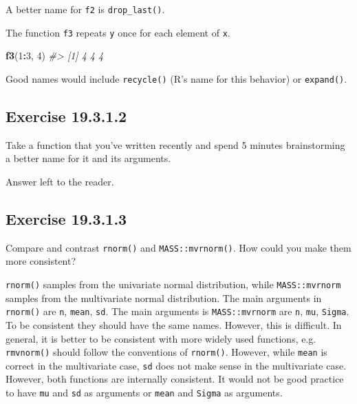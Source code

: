 \documentclass[]{book}
\newenvironment{Shaded}{\begin{snugshade}}{\end{snugshade}}
\newcommand{\CommentTok}[1]{\textcolor[rgb]{0.56,0.35,0.01}{\textit{#1}}}
\newcommand{\DecValTok}[1]{\textcolor[rgb]{0.00,0.00,0.81}{#1}}
\newcommand{\KeywordTok}[1]{\textcolor[rgb]{0.13,0.29,0.53}{\textbf{#1}}}
\newcommand{\NormalTok}[1]{#1}
\newcommand{\OperatorTok}[1]{\textcolor[rgb]{0.81,0.36,0.00}{\textbf{#1}}}
\theoremstyle{plain}
\theoremstyle{remark}
\begin{document}
A better name for \texttt{f2} is \texttt{drop\_last()}.

The function \texttt{f3} repeats \texttt{y} once for each element of
\texttt{x}.

\begin{Shaded}
\begin{Highlighting}[]
\KeywordTok{f3}\NormalTok{(}\DecValTok{1}\OperatorTok{:}\DecValTok{3}\NormalTok{, }\DecValTok{4}\NormalTok{)}
\CommentTok{#> [1] 4 4 4}
\end{Highlighting}
\end{Shaded}

Good names would include \texttt{recycle()} (R's name for this behavior)
or \texttt{expand()}.

\hypertarget{exercise-19.3.1.2}{%
\subsection*{\texorpdfstring{Exercise
{19.3.1.2}}{Exercise 19.3.1.2}}\label{exercise-19.3.1.2}}

Take a function that you've written recently and spend 5 minutes
brainstorming a better name for it and its arguments.

Answer left to the reader.

\hypertarget{exercise-19.3.1.3}{%
\subsection*{\texorpdfstring{Exercise
{19.3.1.3}}{Exercise 19.3.1.3}}\label{exercise-19.3.1.3}}

Compare and contrast \texttt{rnorm()} and \texttt{MASS::mvrnorm()}. How
could you make them more consistent?

\texttt{rnorm()} samples from the univariate normal distribution, while
\texttt{MASS::mvrnorm} samples from the multivariate normal
distribution. The main arguments in \texttt{rnorm()} are \texttt{n},
\texttt{mean}, \texttt{sd}. The main arguments is \texttt{MASS::mvrnorm}
are \texttt{n}, \texttt{mu}, \texttt{Sigma}. To be consistent they
should have the same names. However, this is difficult. In general, it
is better to be consistent with more widely used functions, e.g.
\texttt{rmvnorm()} should follow the conventions of \texttt{rnorm()}.
However, while \texttt{mean} is correct in the multivariate case,
\texttt{sd} does not make sense in the multivariate case. However, both
functions are internally consistent. It would not be good practice to
have \texttt{mu} and \texttt{sd} as arguments or \texttt{mean} and
\texttt{Sigma} as arguments.
\end{document}
